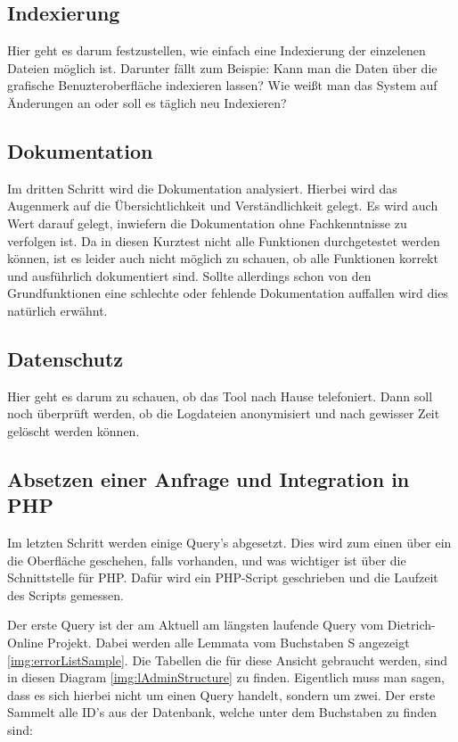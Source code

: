 \subsection{Indexierung}

Hier geht es darum festzustellen, wie einfach eine Indexierung der einzelenen Dateien möglich ist. Darunter fällt zum Beispie: Kann man die Daten über die grafische Benuzteroberfläche indexieren lassen? Wie weißt man das System auf Änderungen an oder soll es täglich neu Indexieren?


\subsection{Dokumentation}

Im dritten Schritt wird die Dokumentation analysiert. Hierbei wird das Augenmerk auf die Übersichtlichkeit und Verständlichkeit gelegt. Es wird auch Wert darauf gelegt, inwiefern die Dokumentation ohne Fachkenntnisse zu verfolgen ist. Da in diesen Kurztest nicht alle Funktionen durchgetestet werden können, ist es leider auch nicht möglich zu schauen, ob alle Funktionen korrekt und ausführlich dokumentiert sind. Sollte allerdings schon von den Grundfunktionen eine schlechte oder fehlende Dokumentation auffallen wird dies natürlich erwähnt. 

\subsection{Datenschutz}

Hier geht es darum zu schauen, ob das Tool nach Hause telefoniert. Dann soll noch überprüft werden, ob die Logdateien anonymisiert und nach gewisser Zeit gelöscht werden können.

\subsection{Absetzen einer Anfrage und Integration in PHP}

Im letzten Schritt werden einige Query’s abgesetzt. Dies wird zum einen über ein die Oberfläche geschehen, falls vorhanden, und was wichtiger ist über die Schnittstelle für PHP. Dafür wird ein PHP-Script geschrieben und die Laufzeit des Scripts gemessen.

Der erste Query ist der am Aktuell am längsten laufende Query vom Dietrich-Online Projekt. Dabei werden alle Lemmata vom Buchstaben S angezeigt \ref{img:errorListSample}. Die Tabellen die für diese Ansicht gebraucht werden, sind in diesen Diagram \ref{img:lAdminStructure} zu finden. Eigentlich muss man sagen, dass es sich hierbei nicht um einen Query handelt, sondern um zwei. Der erste Sammelt alle ID’s aus der Datenbank, welche unter dem Buchstaben zu finden sind:

